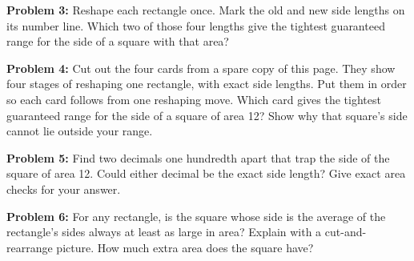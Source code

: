 \documentclass[12pt]{article}
\newcommand{\band}{Grades 3--5}
\newcommand{\problem}[2]{\par\textbf{Problem #1:} #2\par}
\begin{document}
\problem{3}{Reshape each rectangle once. Mark the old and new side lengths on its number line. Which two of those four lengths give the tightest guaranteed range for the side of a square with that area?}
\begin{center}
\end{center}
\newpage
\problem{4}{Cut out the four cards from a spare copy of this page. They show four stages of reshaping one rectangle, with exact side lengths. Put them in order so each card follows from one reshaping move. Which card gives the tightest guaranteed range for the side of a square of area 12? Show why that square's side cannot lie outside your range.}
\begin{center}
\end{center}
\vspace{29mm}
\problem{5}{Find two decimals one hundredth apart that trap the side of the square of area 12. Could either decimal be the exact side length? Give exact area checks for your answer.}
\vfill
\newpage
\renewcommand{\band}{Grades 4--5, ready for general reasoning}
\problem{6}{For any rectangle, is the square whose side is the average of the rectangle's sides always at least as large in area? Explain with a cut-and-rearrange picture. How much extra area does the square have?}
\begin{center}
\end{center}
\end{document}

